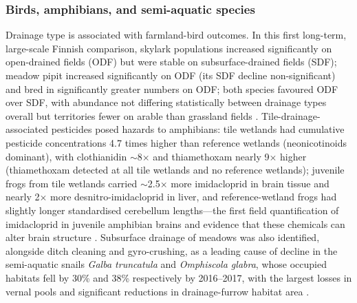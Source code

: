 \subsubsection{Birds, amphibians, and semi-aquatic species}
Drainage type is associated with farmland-bird outcomes. In this first long-term, large-scale Finnish comparison, skylark populations increased significantly on open-drained fields (ODF) but were stable on subsurface-drained fields (SDF); meadow pipit increased significantly on ODF (its SDF decline non-significant) and bred in significantly greater numbers on ODF; both species favoured ODF over SDF, with abundance not differing statistically between drainage types overall but territories fewer on arable than grassland fields \parencite{Marja2013}. Tile-drainage-associated pesticides posed hazards to amphibians: tile wetlands had cumulative pesticide concentrations 4.7 times higher than reference wetlands (neonicotinoids dominant), with clothianidin $\sim$8$\times$ and thiamethoxam nearly 9$\times$ higher (thiamethoxam detected at all tile wetlands and no reference wetlands); juvenile frogs from tile wetlands carried $\sim$2.5$\times$ more imidacloprid in brain tissue and nearly 2$\times$ more desnitro-imidacloprid in liver, and reference-wetland frogs had slightly longer standardised cerebellum lengths---the first field quantification of imidacloprid in juvenile amphibian brains and evidence that these chemicals can alter brain structure \parencite{Campbell2023}. Subsurface drainage of meadows was also identified, alongside ditch cleaning and gyro-crushing, as a leading cause of decline in the semi-aquatic snails \textit{Galba truncatula} and \textit{Omphiscola glabra}, whose occupied habitats fell by 30\% and 38\% respectively by 2016--2017, with the largest losses in vernal pools and significant reductions in drainage-furrow habitat area \parencite{Dreyfuss2018}.

